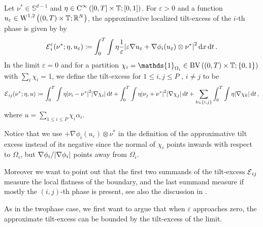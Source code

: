 \begin{definition}
	Let $ \nu^{ \ast } \in \mathbb{ S }^{ d - 1 } $ and $ \eta \in \operatorname{C}^{ 
	\infty } \left( [ 0 , T ] \times \operatorname{\mathbb{T}} ; [ 0 , 1 ] \right) $. For $ 
	\varepsilon > 0 $ and a function $ u_{ \varepsilon } \in \operatorname{W}^{ 1 , 2 } 
	\left( ( 0 , T ) \times \operatorname{\mathbb{T}} ; \mathbb{ R }^{ N } \right) $, the 
	approximative localized tilt-excess of the $ i$-th phase is given by by
	\begin{equation*}
		\tilt_excess_{ i }^{ \varepsilon } ( \nu^{ \ast } ; \eta , u_{ 
		\varepsilon } )
		\coloneqq
		\int_{ 0 }^{ T }
			\int
				\eta
				\frac{ 1 }{ \varepsilon }
				\abs{ 
					\varepsilon \nabla u_{ \varepsilon } 
					+
					\nabla \phi_{ i } ( u_{ \varepsilon } ) 
					\otimes
					\nu^{ \ast }
				}^{ 2 }
			\dd{ x }
		\dd{ t }.
	\end{equation*}
	In the limit $ \varepsilon = 0 $ and for a partition 
	$ \chi_{ i } = \mathds{ 1 }_{ \Omega_{ i } } \in \bv \left(
		( 0 , T ) \times \flattorus ; \{ 0 , 1 \} 
	\right) $
	with $ \sum_{ i } \chi_{ i } = 1 $,
	we define the tilt-excess for $ 1 \leq i, j \leq P $ , $ i \neq j $ to be
	\begin{equation*}
		\tilt_excess_{ i j } ( \nu^{ \ast } ; \eta , u ) 
		\coloneqq
		\int_{ 0 }^{ T }
			\int
				\eta
				\abs{ \nu_{ i } - \nu^{ \ast } }^{ 2 }
			\abs{ \nabla \chi_{ i } }
		\dd{ t }
		+
		\int_{ 0 }^{ T }
			\int
				\eta
				\abs{ \nu_{ j } + \nu^{ \ast } }^{ 2 }
			\abs{ \nabla \chi_{ j } }
		\dd{ t }
		+
		\sum_{ k \in \{ i , j \} }
			\int_{ 0 }^{ T }
				\int
					\eta 
				\abs{ \nabla \chi_{ k } }
			\dd{ t },
	\end{equation*}
	where $ u = \sum_{ 1 \leq i \leq P } \chi_{ i } \alpha_{ i } $.
\end{definition}

Notice that we use $ + \nabla \phi_{ i } ( u_{ \varepsilon } ) \otimes \nu^{ 
\ast } $ in the definition of the approximative tilt excess instead of its 
negative since the normal of $ \chi_{ i } $ points inwards with respect to $ 
\Omega_{ i } $, but $ \nabla \phi_{ i } / \abs{ \nabla \phi_{ i } } $ points 
away from $ \Omega_{ i } $.

Moreover we want to point out that the first two summands of the tilt-excess $ 
\tilt_excess_{ i j } $ measure the local flatness of the boundary, and the 
last summand measure if mostly the $(i,j)$-th phase is present, see also the 
discussion in .

As in the twophase case, we first want to argue that when $ \varepsilon $ 
approaches zero, the approximate tilt-excess can be bounded by the tilt-excess 
of the limit.

